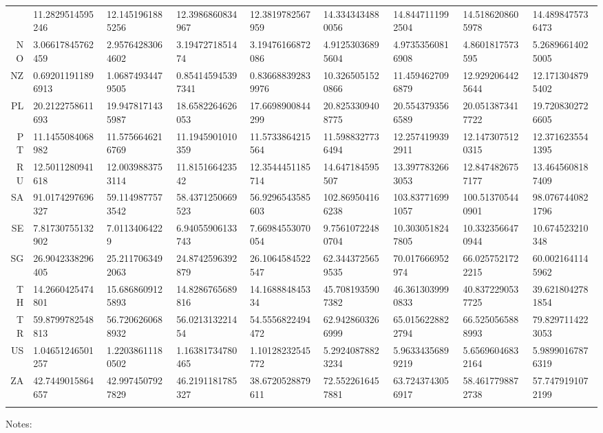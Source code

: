\documentclass[12pt,a4paper]{article}
\begin{document}
\begin{table}
\begin{threeparttable}
\begin{tabular}
{NL} & 11.2829514595246 & 12.1451961885256 & 12.3986860834967 & 12.3819782567959 & 14.3343434880056 & 14.8447111992504 & 14.5186208605978 & 14.4898475736473 \\
{NO} & 3.06617845762459 & 2.95764283064602 & 3.1947271851474 & 3.19476166872086 & 4.91253036895604 & 4.97353560816908 & 4.8601817573595 & 5.26896614025005 \\
{NZ} & 0.692011911896913 & 1.06874934479505 & 0.854145945397341 & 0.836688392839976 & 10.3265051520866 & 11.4594627096879 & 12.9292064425644 & 12.1713048795402 \\
{PL} & 20.2122758611693 & 19.9478171435987 & 18.6582264626053 & 17.6698900844299 & 20.8253309408775 & 20.5543793566589 & 20.0513873417722 & 19.7208302726605 \\
{PT} & 11.1455084068982 & 11.5756646216769 & 11.1945901010359 & 11.5733864215564 & 11.5988327736494 & 12.2574199392911 & 12.1473075120315 & 12.3716235541395 \\
{RU} & 12.5011280941618 & 12.0039883753114 & 11.815166423542 & 12.3544451185714 & 14.647184595507 & 13.3977832663053 & 12.8474826757177 & 13.4645608187409 \\
{SA} & 91.0174297696327 & 59.1149877573542 & 58.4371250669523 & 56.9296543585603 & 102.869504166238 & 103.837716991057 & 100.513705440901 & 98.0767440821796 \\
{SE} & 7.81730755132902 & 7.01134064229 & 6.94055906133743 & 7.66984553070054 & 9.75610722480704 & 10.3030518247805 & 10.3323566470944 & 10.674523210348 \\
{SG} & 26.9042338296405 & 25.2117063492063 & 24.8742596392879 & 26.1064584522547 & 62.3443725659535 & 70.017666952974 & 66.0257521722215 & 60.0021641145962 \\
{TH} & 14.2660425474801 & 15.6868609125893 & 14.8286765689816 & 14.168884845334 & 45.7081935907382 & 46.3613039990833 & 40.8372290537725 & 39.6218042781854 \\
{TR} & 59.8799782548813 & 56.7206260688932 & 56.021313221454 & 54.5556822494472 & 62.9428603266999 & 65.0156228822794 & 66.5250565888993 & 79.8297114223053 \\
{US} & 1.04651246501257 & 1.22038611180502 & 1.16381734780465 & 1.10128232545772 & 5.29240878823234 & 5.96334356899219 & 5.65696046832164 & 5.98990167876319 \\
{ZA} & 42.7449015864657 & 42.9974507927829 & 46.2191181785327 & 38.6720528879611 & 72.5522616457881 & 63.7243743056917 & 58.4617798872738 & 57.7479191072199 \\

  \bottomrule
  \addlinespace[.75ex]
\end{tabular}

\label{tab:table }

\begin{tablenotes}
\scriptsize
\item Notes:


\end{tablenotes}

\end{threeparttable}

\end{table}
\end{document}
